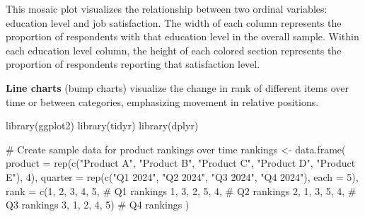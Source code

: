 \documentclass[
  letterpaper,
  DIV=11,
  numbers=noendperiod]{scrartcl}
\newenvironment{Shaded}{\begin{snugshade}}{\end{snugshade}}
\newcommand{\AttributeTok}[1]{\textcolor[rgb]{0.40,0.45,0.13}{#1}}
\newcommand{\CommentTok}[1]{\textcolor[rgb]{0.37,0.37,0.37}{#1}}
\newcommand{\DecValTok}[1]{\textcolor[rgb]{0.68,0.00,0.00}{#1}}
\newcommand{\FunctionTok}[1]{\textcolor[rgb]{0.28,0.35,0.67}{#1}}
\newcommand{\NormalTok}[1]{\textcolor[rgb]{0.00,0.23,0.31}{#1}}
\newcommand{\OtherTok}[1]{\textcolor[rgb]{0.00,0.23,0.31}{#1}}
\newcommand{\StringTok}[1]{\textcolor[rgb]{0.13,0.47,0.30}{#1}}
\begin{document}
This mosaic plot visualizes the relationship between two ordinal
variables: education level and job satisfaction. The width of each
column represents the proportion of respondents with that education
level in the overall sample. Within each education level column, the
height of each colored section represents the proportion of respondents
reporting that satisfaction level.

\textbf{Line charts} (bump charts) visualize the change in rank of
different items over time or between categories, emphasizing movement in
relative positions.

\begin{Shaded}
\begin{Highlighting}[]
\FunctionTok{library}\NormalTok{(ggplot2)}
\FunctionTok{library}\NormalTok{(tidyr)}
\FunctionTok{library}\NormalTok{(dplyr)}

\CommentTok{\# Create sample data for product rankings over time}
\NormalTok{rankings }\OtherTok{\textless{}{-}} \FunctionTok{data.frame}\NormalTok{(}
  \AttributeTok{product =} \FunctionTok{rep}\NormalTok{(}\FunctionTok{c}\NormalTok{(}\StringTok{"Product A"}\NormalTok{, }\StringTok{"Product B"}\NormalTok{, }
                  \StringTok{"Product C"}\NormalTok{, }\StringTok{"Product D"}\NormalTok{, }\StringTok{"Product E"}\NormalTok{), }\DecValTok{4}\NormalTok{),}
  \AttributeTok{quarter =} \FunctionTok{rep}\NormalTok{(}\FunctionTok{c}\NormalTok{(}\StringTok{"Q1 2024"}\NormalTok{, }\StringTok{"Q2 2024"}\NormalTok{, }
                  \StringTok{"Q3 2024"}\NormalTok{, }\StringTok{"Q4 2024"}\NormalTok{), }\AttributeTok{each =} \DecValTok{5}\NormalTok{),}
  \AttributeTok{rank =} \FunctionTok{c}\NormalTok{(}\DecValTok{1}\NormalTok{, }\DecValTok{2}\NormalTok{, }\DecValTok{3}\NormalTok{, }\DecValTok{4}\NormalTok{, }\DecValTok{5}\NormalTok{,       }\CommentTok{\# Q1 rankings}
           \DecValTok{1}\NormalTok{, }\DecValTok{3}\NormalTok{, }\DecValTok{2}\NormalTok{, }\DecValTok{5}\NormalTok{, }\DecValTok{4}\NormalTok{,       }\CommentTok{\# Q2 rankings}
           \DecValTok{2}\NormalTok{, }\DecValTok{1}\NormalTok{, }\DecValTok{3}\NormalTok{, }\DecValTok{5}\NormalTok{, }\DecValTok{4}\NormalTok{,       }\CommentTok{\# Q3 rankings}
           \DecValTok{3}\NormalTok{, }\DecValTok{1}\NormalTok{, }\DecValTok{2}\NormalTok{, }\DecValTok{4}\NormalTok{, }\DecValTok{5}\NormalTok{)       }\CommentTok{\# Q4 rankings}
\NormalTok{)}


\end{Highlighting}
\end{Shaded}
\end{document}
